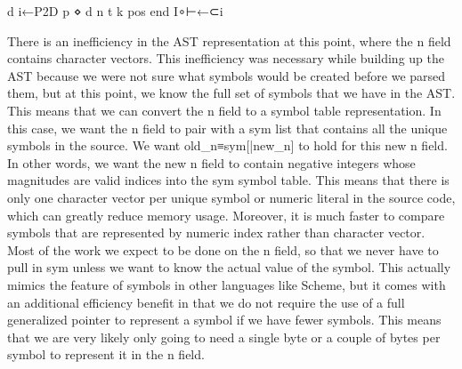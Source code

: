 \documentclass{article}%
\begin{document}
\nwenddocs{}\endmoddef\nwstartdeflinemarkup{}\nwenddeflinemarkup
d i←P2D p ⋄ d n t k pos end I∘⊢←⊂i
\nwendcode{}\nwdocspar

There is an inefficiency in the AST representation at this point,
where the {\Tt{}n\nwendquote} field contains character vectors.
This inefficiency was necessary while building up the AST because
we were not sure what symbols would be created
before we parsed them,
but at this point, we know the full set of symbols that we have in 
the AST.
This means that we can convert the {\Tt{}n\nwendquote} field to a symbol table 
representation.
In this case, we want the {\Tt{}n\nwendquote} field to pair with a {\Tt{}sym\nwendquote} list
that contains all the unique symbols in the source.
We want {\Tt{}old{\_}n≡sym[|new{\_}n]\nwendquote} to hold for this new {\Tt{}n\nwendquote} field.
In other words, we want the new {\Tt{}n\nwendquote} field to contain negative 
integers whose magnitudes are valid indices into the {\Tt{}sym\nwendquote} 
symbol table.
This means that there is only one character vector per unique symbol
or numeric literal in the source code, which can greatly reduce 
memory usage.
Moreover, it is much faster to compare symbols that are represented by 
numeric index rather than character vector.
Most of the work we expect to be done on the {\Tt{}n\nwendquote} field, so that we 
never have to pull in {\Tt{}sym\nwendquote} unless we want to know the actual value 
of the symbol.
This actually mimics the feature of symbols in other languages
like Scheme,
but it comes with an additional efficiency benefit in that we do not
require the use of a full generalized pointer to represent a symbol
if we have fewer symbols. 
This means that we are very likely only going to need a single byte 
or a couple of bytes per symbol to represent it in the {\Tt{}n\nwendquote} field.
\end{document}
